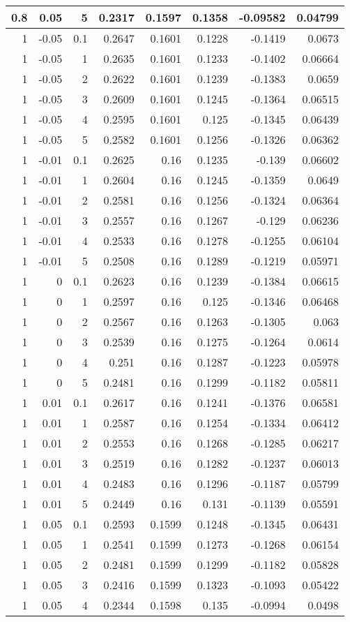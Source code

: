 \documentclass{amsart}
\theoremstyle{plain}
\numberwithin{equation}{section}
\begin{document}
\begin{longtable}{r | r | r | r | r | r | r | r}
0.8 & 0.05 & 5 & 0.2317 & 0.1597 & 0.1358 & -0.09582 & 0.04799 \\ \hline
1 & -0.05 & 0.1 & 0.2647 & 0.1601 & 0.1228 & -0.1419 & 0.0673 \\
1 & -0.05 & 1 & 0.2635 & 0.1601 & 0.1233 & -0.1402 & 0.06664 \\
1 & -0.05 & 2 & 0.2622 & 0.1601 & 0.1239 & -0.1383 & 0.0659 \\
1 & -0.05 & 3 & 0.2609 & 0.1601 & 0.1245 & -0.1364 & 0.06515 \\
1 & -0.05 & 4 & 0.2595 & 0.1601 & 0.125 & -0.1345 & 0.06439 \\
1 & -0.05 & 5 & 0.2582 & 0.1601 & 0.1256 & -0.1326 & 0.06362 \\ \hline
1 & -0.01 & 0.1 & 0.2625 & 0.16 & 0.1235 & -0.139 & 0.06602 \\
1 & -0.01 & 1 & 0.2604 & 0.16 & 0.1245 & -0.1359 & 0.0649 \\
1 & -0.01 & 2 & 0.2581 & 0.16 & 0.1256 & -0.1324 & 0.06364 \\
1 & -0.01 & 3 & 0.2557 & 0.16 & 0.1267 & -0.129 & 0.06236 \\
1 & -0.01 & 4 & 0.2533 & 0.16 & 0.1278 & -0.1255 & 0.06104 \\
1 & -0.01 & 5 & 0.2508 & 0.16 & 0.1289 & -0.1219 & 0.05971 \\ \hline
1 & 0 & 0.1 & 0.2623 & 0.16 & 0.1239 & -0.1384 & 0.06615 \\
1 & 0 & 1 & 0.2597 & 0.16 & 0.125 & -0.1346 & 0.06468 \\
1 & 0 & 2 & 0.2567 & 0.16 & 0.1263 & -0.1305 & 0.063 \\
1 & 0 & 3 & 0.2539 & 0.16 & 0.1275 & -0.1264 & 0.0614 \\
1 & 0 & 4 & 0.251 & 0.16 & 0.1287 & -0.1223 & 0.05978 \\
1 & 0 & 5 & 0.2481 & 0.16 & 0.1299 & -0.1182 & 0.05811 \\ \hline
1 & 0.01 & 0.1 & 0.2617 & 0.16 & 0.1241 & -0.1376 & 0.06581 \\
1 & 0.01 & 1 & 0.2587 & 0.16 & 0.1254 & -0.1334 & 0.06412 \\
1 & 0.01 & 2 & 0.2553 & 0.16 & 0.1268 & -0.1285 & 0.06217 \\
1 & 0.01 & 3 & 0.2519 & 0.16 & 0.1282 & -0.1237 & 0.06013 \\
1 & 0.01 & 4 & 0.2483 & 0.16 & 0.1296 & -0.1187 & 0.05799 \\
1 & 0.01 & 5 & 0.2449 & 0.16 & 0.131 & -0.1139 & 0.05591 \\ \hline
1 & 0.05 & 0.1 & 0.2593 & 0.1599 & 0.1248 & -0.1345 & 0.06431 \\
1 & 0.05 & 1 & 0.2541 & 0.1599 & 0.1273 & -0.1268 & 0.06154 \\
1 & 0.05 & 2 & 0.2481 & 0.1599 & 0.1299 & -0.1182 & 0.05828 \\
1 & 0.05 & 3 & 0.2416 & 0.1599 & 0.1323 & -0.1093 & 0.05422 \\
1 & 0.05 & 4 & 0.2344 & 0.1598 & 0.135 & -0.0994 & 0.0498
\label{skewtable}
\end{longtable}
\end{document}
